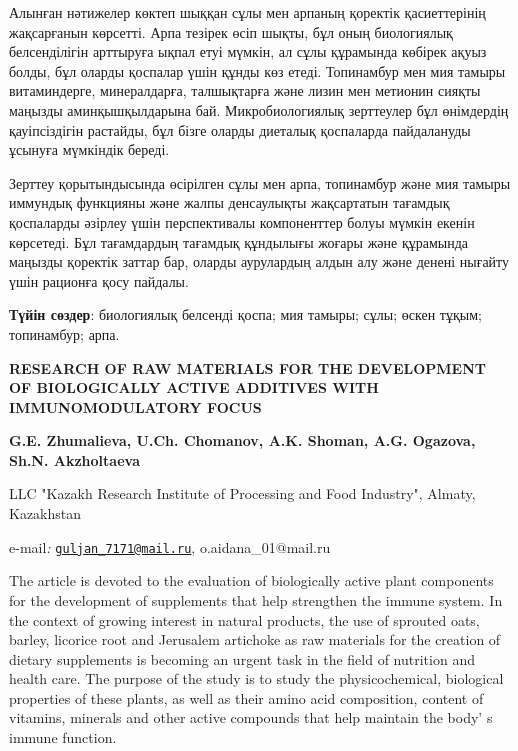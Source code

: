 Алынған нәтижелер көктеп шыққан сұлы мен арпаның қоректік қасиеттерінің
жақсарғанын көрсетті. Арпа тезірек өсіп шықты, бұл оның биологиялық
белсенділігін арттыруға ықпал етуі мүмкін, ал сұлы құрамында көбірек
ақуыз болды, бұл оларды қоспалар үшін құнды көз етеді. Топинамбур мен
мия тамыры витаминдерге, минералдарға, талшықтарға және лизин мен
метионин сияқты маңызды аминқышқылдарына бай. Микробиологиялық
зерттеулер бұл өнімдердің қауіпсіздігін растайды, бұл бізге оларды
диеталық қоспаларда пайдалануды ұсынуға мүмкіндік береді.

Зерттеу қорытындысында өсірілген сұлы мен арпа, топинамбур және мия
тамыры иммундық функцияны және жалпы денсаулықты жақсартатын тағамдық
қоспаларды әзірлеу үшін перспективалы компоненттер болуы мүмкін екенін
көрсетеді. Бұл тағамдардың тағамдық құндылығы жоғары және құрамында
маңызды қоректік заттар бар, оларды аурулардың алдын алу және денені
нығайту үшін рационға қосу пайдалы.

{\bfseries Түйін сөздер}: биологиялық белсенді қоспа; мия тамыры; сұлы;
өскен тұқым; топинамбур; арпа.

\begin{articleheader}
{\bfseries RESEARCH OF RAW MATERIALS FOR THE DEVELOPMENT OF BIOLOGICALLY ACTIVE ADDITIVES WITH IMMUNOMODULATORY FOCUS}

{\bfseries
G.E. Zhumalieva\textsuperscript{\envelope },
U.Ch. Chomanov,
A.K. Shoman,
A.G. Ogazova\textsuperscript{\envelope },
Sh.N. Akzholtaeva
}
\end{articleheader}

\begin{affiliation}
LLC "Kazakh Research Institute of Processing and Food Industry", Almaty,
Kazakhstan

e-mail\emph{:}
\href{mailto:guljan\_7171@mail.ru}{\nolinkurl{guljan\_7171@mail.ru}},
o.aidana\_01@mail.ru
\end{affiliation}

The article is devoted to the evaluation of biologically active plant
components for the development of supplements that help strengthen the
immune system. In the context of growing interest in natural products,
the use of sprouted oats, barley, licorice root and Jerusalem artichoke
as raw materials for the creation of dietary supplements is becoming an
urgent task in the field of nutrition and health care. The purpose of
the study is to study the physicochemical, biological properties of
these plants, as well as their amino acid composition, content of
vitamins, minerals and other active compounds that help maintain the
body' s immune function.

